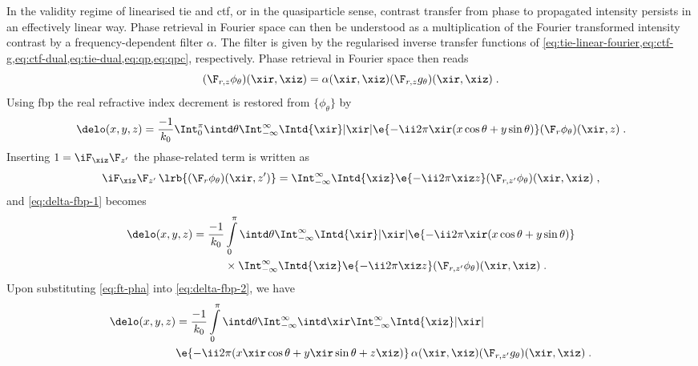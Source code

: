 \documentclass[
twoside,
openright,
titlepage,
numbers=noenddot,
headinclude,
fleqn,
a4paper,
footinclude=true,
cleardoublepage=empty,
abstractoff,
BCOR=5mm,
paper=a4,
fontsize=11pt,
british,ngerman,american,
]{scrreprt}
\begin{document}
In the validity regime of linearised \ac{tie} and \ac{ctf}, or in the
quasiparticle sense, contrast transfer from phase to propagated
intensity persists in an effectively linear way.  Phase retrieval in
Fourier space can then be understood as a multiplication of the
Fourier transformed intensity contrast by a frequency-dependent filter
$\alpha$.  The filter is given by the regularised inverse transfer
functions of
\cref{eq:tie-linear-fourier,eq:ctf-g,eq:ctf-dual,eq:tie-dual,eq:qp,eq:qpc},
respectively.  Phase retrieval in Fourier space then reads
\begin{equation}
  \label{eq:ft-pha}
  (\F_{r,z}\phi_\theta)(\xir,\xiz)=
  \alpha(\xir,\xiz)(\F_{r,z}g_\theta)(\xir,\xiz) \;.
\end{equation}
Using \ac{fbp} the real refractive index decrement is restored from
$\{\phi_\theta\}$ by
\begin{equation}
  \label{eq:delta-fbp-1}
  \delo(x,y,z) = \frac{-1}{k_0}\Int_0^{\pi} \intd
  \theta \Int_{-\infty}^\infty \Intd{\xir}|\xir|
  \e{-\ii 2\pi\xir(x\cos\theta+y\sin\theta)}
  (\F_r\phi_\theta)(\xir,z) \;.
\end{equation}
Inserting $1=\iF_\xiz\F_{z'}$ the phase-related term is written as
\begin{equation}
  \label{eq:phase-one}
  \iF_\xiz\F_{z'}\,\lrb{(\F_r\phi_\theta)(\xir,z')} = \Int_{-\infty}^\infty
  \Intd{\xiz}\e{-\ii 2\pi\xiz z} (\F_{r,z'}\phi_\theta)(\xir,\xiz) \;,
\end{equation}
and \cref{eq:delta-fbp-1} becomes
\begin{equation}
  \label{eq:delta-fbp-2}
  \begin{split}
    \delo(x,y,z) = 
    \frac{-1}{k_0}&\int\limits_0^{\pi} \intd \theta \Int_{-\infty}^\infty
    \Intd{\xir}|\xir| 
    \e{-\ii 2\pi\xir( x\cos\theta + y\sin\theta)} 
    \\ & \times\Int_{-\infty}^\infty\Intd{\xiz} \e{-\ii 2\pi\xiz z}
    (\F_{r,z'}\phi_\theta)(\xir,\xiz) \;.
  \end{split}
\end{equation}
Upon substituting \cref{eq:ft-pha} into \cref{eq:delta-fbp-2}, we have
\begin{equation}
  \label{eq:delta-fbp-3}
  \begin{split}
    \delo(x,y,z)& = \frac{-1}{k_0}\int\limits_0^{\pi}\intd\theta
    \Int_{-\infty}^\infty\intd\xir
    \Int_{-\infty}^\infty\Intd{\xiz} |\xir|
    \\ & \e{-\ii 2\pi(x\xir\cos\theta+y\xir\sin\theta+z\xiz)}
    \,\alpha(\xir,\xiz)(\F_{r,z'}g_\theta)(\xir,\xiz) \;.
  \end{split}
\end{equation}
\end{document}
